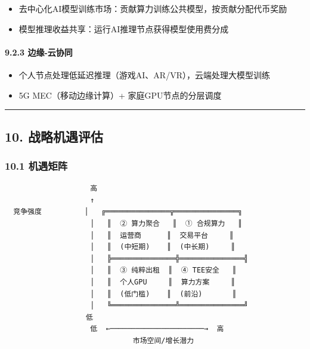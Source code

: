 \documentclass[UTF8,a4paper,12pt]{ctexart}
\begin{document}
\begin{itemize}
\tightlist
\item
  去中心化AI模型训练市场：贡献算力训练公共模型，按贡献分配代币奖励
\item
  模型推理收益共享：运行AI推理节点获得模型使用费分成
\end{itemize}

\paragraph{9.2.3 边缘-云协同}\label{ux8fb9ux7f18-ux4e91ux534fux540c}

\begin{itemize}
\tightlist
\item
  个人节点处理低延迟推理（游戏AI、AR/VR），云端处理大模型训练
\item
  5G MEC（移动边缘计算）+ 家庭GPU节点的分层调度
\end{itemize}

\begin{center}\rule{0.5\linewidth}{0.5pt}\end{center}

\pagebreak

\subsection{10.
战略机遇评估}\label{ux6218ux7565ux673aux9047ux8bc4ux4f30}

\subsubsection{10.1 机遇矩阵}\label{ux673aux9047ux77e9ux9635}

\begin{verbatim}
                    高
                    ↑
  竞争强度          │   ╔═══════════════╦═══════════════╗
                    │   ║  ② 算力聚合   ║  ① 合规算力   ║
                    │   ║  运营商      ║  交易平台     ║
                    │   ║  (中短期)    ║  (中长期)     ║
                    │   ╠═══════════════╬═══════════════╣
                    │   ║  ③ 纯粹出租  ║  ④ TEE安全   ║
                    │   ║  个人GPU     ║  算力方案     ║
                    │   ║  (低门槛)    ║  (前沿)       ║
                    │   ╚═══════════════╩═══════════════╝
                   低
                    低  ←──────────────────────→  高
                              市场空间/增长潜力
\end{verbatim}
\end{document}
